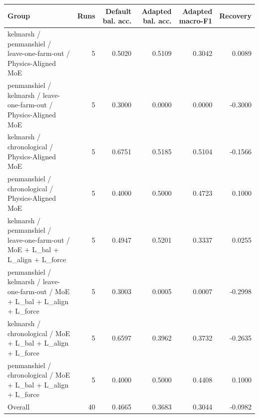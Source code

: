 \begin{tabular}{lrrrrr}
\toprule
Group & Runs & Default bal. acc. & Adapted bal. acc. & Adapted macro-F1 & Recovery \\
\midrule
kelmarsh / penmanshiel / leave-one-farm-out / Physics-Aligned MoE & 5 & 0.5020 & 0.5109 & 0.3042 & 0.0089 \\
penmanshiel / kelmarsh / leave-one-farm-out / Physics-Aligned MoE & 5 & 0.3000 & 0.0000 & 0.0000 & -0.3000 \\
kelmarsh / chronological / Physics-Aligned MoE & 5 & 0.6751 & 0.5185 & 0.5104 & -0.1566 \\
penmanshiel / chronological / Physics-Aligned MoE & 5 & 0.4000 & 0.5000 & 0.4723 & 0.1000 \\
kelmarsh / penmanshiel / leave-one-farm-out / MoE + L\_bal + L\_align + L\_force & 5 & 0.4947 & 0.5201 & 0.3337 & 0.0255 \\
penmanshiel / kelmarsh / leave-one-farm-out / MoE + L\_bal + L\_align + L\_force & 5 & 0.3003 & 0.0005 & 0.0007 & -0.2998 \\
kelmarsh / chronological / MoE + L\_bal + L\_align + L\_force & 5 & 0.6597 & 0.3962 & 0.3732 & -0.2635 \\
penmanshiel / chronological / MoE + L\_bal + L\_align + L\_force & 5 & 0.4000 & 0.5000 & 0.4408 & 0.1000 \\
Overall & 40 & 0.4665 & 0.3683 & 0.3044 & -0.0982 \\
\bottomrule
\end{tabular}
